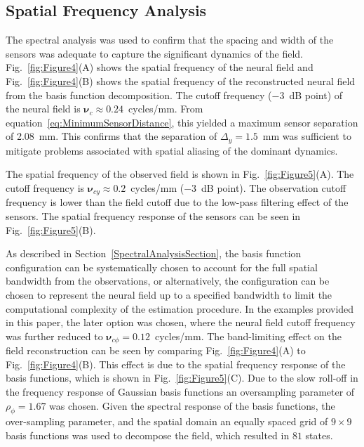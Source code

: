 \documentclass[review,authoryear,3p]{elsarticle}
\begin{document}
\subsection{Spatial Frequency Analysis}
The spectral analysis was used to confirm that the spacing and width of the sensors was adequate to capture the significant dynamics of the field. Fig.~\ref{fig:Figure4}(A) shows the spatial frequency of the neural field and Fig.~\ref{fig:Figure4}(B) shows the spatial frequency of the reconstructed neural field from the basis function decomposition. The cutoff frequency ($-3$~dB point) of the neural field is $\boldsymbol{\nu}_c \approx 0.24$~cycles/mm. From equation~\ref{eq:MinimumSensorDistance}, this yielded a maximum sensor separation of 2.08~mm. This confirms that the separation of $\Delta_{y} = 1.5$~mm was sufficient to mitigate problems associated with spatial aliasing of the dominant dynamics.

The spatial frequency of the observed field is shown in Fig.~\ref{fig:Figure5}(A). The cutoff frequency is $\boldsymbol{\nu}_{cy} \approx 0.2$~cycles/mm ($-3$~dB point). The observation cutoff frequency is lower than the field cutoff due to the low-pass filtering effect of the sensors. The spatial frequency response of the sensors can be seen in Fig.~\ref{fig:Figure5}(B). 

As described in Section~\ref{SpectralAnalysisSection}, the basis function configuration can be systematically chosen to account for the full spatial bandwidth from the observations, or alternatively, the configuration can be chosen to represent the neural field up to a specified bandwidth to limit the computational complexity of the estimation procedure. In the examples provided in this paper, the later option was chosen, where the neural field cutoff frequency was further reduced to $\boldsymbol{\nu}_{c\phi} = 0.12$~cycles/mm. The band-limiting effect on the field reconstruction can be seen by comparing Fig.~\ref{fig:Figure4}(A) to Fig.~\ref{fig:Figure4}(B). This effect is due to the spatial frequency response of the basis functions, which is shown in Fig.~\ref{fig:Figure5}(C). Due to the slow roll-off in the frequency response of Gaussian basis functions an oversampling parameter of $\rho_{\phi} = 1.67$ was chosen. Given the spectral response of the basis functions, the over-sampling parameter, and the spatial domain an equally spaced grid of $9\times9$ basis functions was used to decompose the field, which resulted in $81$ states. 
\end{document}

